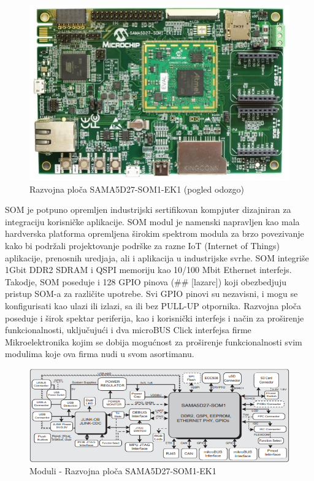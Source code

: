 \documentclass[a4paper,12pt, master]{etf}
\begin{document}
	\begin{figure}[htb]
		\centering
		\includegraphics[scale=.7]{../pic/hw_top_view.png}
		\caption{Razvojna plo\v{c}a SAMA5D27-SOM1-EK1 (pogled odozgo)}
		\label{fig:hw_top_view}
	\end{figure}

	SOM je potpuno opremljen industrijski sertifikovan kompjuter dizajniran za integraciju
	korisni\v{c}ke aplikacije. SOM modul je namenski napravljen kao mala hardverska platforma
	opremljena \v{s}irokim spektrom modula za brzo povezivanje kako bi podr\v{z}ali	
	projektovanje podr\v{s}ke za razne IoT (Internet of Things) aplikacije, prenosnih uredjaja, 
	ali i aplikacija u industrijske svrhe. SOM integri\v{s}e 1Gbit DDR2 SDRAM i QSPI memoriju 
	kao 10/100 Mbit Ethernet interfejs. Takodje, SOM poseduje i 128 GPIO pinova (\#\# [lazarc]) 
	koji obezbedjuju pristup SOM-a za razli\v{c}ite upotrebe. Svi GPIO pinovi su nezavisni, i 
	mogu se konfigurisati kao ulazi	ili izlazi, sa ili bez PULL-UP otpornika. Razvojna plo\v{c}a 
	poseduje  i \v{s}irok spektar periferija, kao i korisni\v{c}ki interfejs i na\v{c}in za 
	pro\v{s}irenje funkcionalnosti, uklju\v{c}uju\'{c}i i dva microBUS Click interfejsa firme 
	Mikroelektronika kojim se dobija mogu\'{c}nost za pro\v{s}irenje funkcionalnosti svim 
	modulima koje ova firma nudi u svom asortimanu.

	\begin{figure}[htb]
		\centering
		\includegraphics[scale=.7]{../pic/hw_modules.png}
		\caption{Moduli - Razvojna plo\v{c}a SAMA5D27-SOM1-EK1}
		\label{fig:hw_modules}
	\end{figure}
\end{document}
